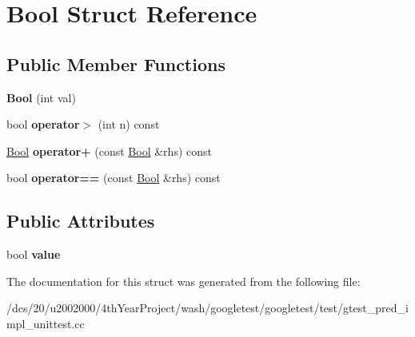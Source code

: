 \hypertarget{structBool}{}\section{Bool Struct Reference}
\label{structBool}
\subsection*{Public Member Functions}
\begin{DoxyCompactItemize}
\item 
\mbox{\label{structBool_a03dfd4851b13abb29414887fcada7fca}} 
{\bfseries Bool} (int val)
\item 
\mbox{\label{structBool_a7baecbc58992eb06157fbbbaa560be0b}} 
bool {\bfseries operator$>$} (int n) const
\item 
\mbox{\label{structBool_a6f4ecdec19082e896cffce66e6b6e7cc}} 
\mbox{\hyperlink{structBool}{Bool}} {\bfseries operator+} (const \mbox{\hyperlink{structBool}{Bool}} \&rhs) const
\item 
\mbox{\label{structBool_afe799a4977c5ebe4c215d5d4ebd77adb}} 
bool {\bfseries operator==} (const \mbox{\hyperlink{structBool}{Bool}} \&rhs) const
\end{DoxyCompactItemize}
\subsection*{Public Attributes}
\begin{DoxyCompactItemize}
\item 
\mbox{\label{structBool_a16be863c269f988cdcbe59f9d846a141}} 
bool {\bfseries value}
\end{DoxyCompactItemize}


The documentation for this struct was generated from the following file\+:\begin{DoxyCompactItemize}
\item 
/dcs/20/u2002000/4th\+Year\+Project/wash/googletest/googletest/test/gtest\+\_\+pred\+\_\+impl\+\_\+unittest.\+cc\end{DoxyCompactItemize}
